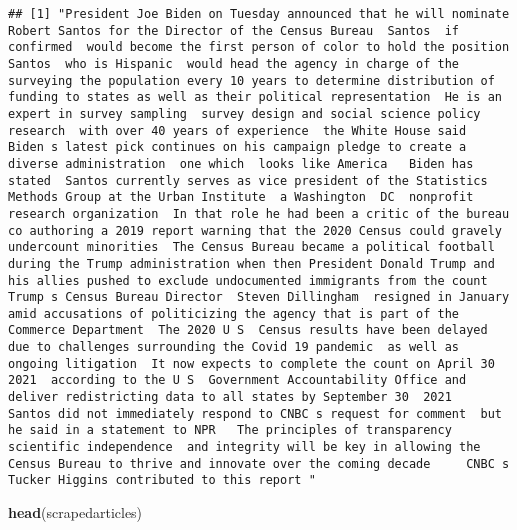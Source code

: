 \documentclass[
]{article}
\newenvironment{Shaded}{\begin{snugshade}}{\end{snugshade}}
\newcommand{\KeywordTok}[1]{\textcolor[rgb]{0.13,0.29,0.53}{\textbf{#1}}}
\newcommand{\NormalTok}[1]{#1}
\begin{document}
\begin{verbatim}
## [1] "President Joe Biden on Tuesday announced that he will nominate Robert Santos for the Director of the Census Bureau  Santos  if confirmed  would become the first person of color to hold the position  Santos  who is Hispanic  would head the agency in charge of the surveying the population every 10 years to determine distribution of funding to states as well as their political representation  He is an expert in survey sampling  survey design and social science policy research  with over 40 years of experience  the White House said   Biden s latest pick continues on his campaign pledge to create a diverse administration  one which  looks like America   Biden has stated  Santos currently serves as vice president of the Statistics Methods Group at the Urban Institute  a Washington  DC  nonprofit research organization  In that role he had been a critic of the bureau  co authoring a 2019 report warning that the 2020 Census could gravely undercount minorities  The Census Bureau became a political football during the Trump administration when then President Donald Trump and his allies pushed to exclude undocumented immigrants from the count  Trump s Census Bureau Director  Steven Dillingham  resigned in January amid accusations of politicizing the agency that is part of the Commerce Department  The 2020 U S  Census results have been delayed due to challenges surrounding the Covid 19 pandemic  as well as ongoing litigation  It now expects to complete the count on April 30  2021  according to the U S  Government Accountability Office and  deliver redistricting data to all states by September 30  2021   Santos did not immediately respond to CNBC s request for comment  but he said in a statement to NPR   The principles of transparency  scientific independence  and integrity will be key in allowing the Census Bureau to thrive and innovate over the coming decade     CNBC s Tucker Higgins contributed to this report "
\end{verbatim}

\begin{Shaded}
\begin{Highlighting}[]
\KeywordTok{head}\NormalTok{(scrapedarticles)}
\end{Highlighting}
\end{Shaded}
\end{document}
